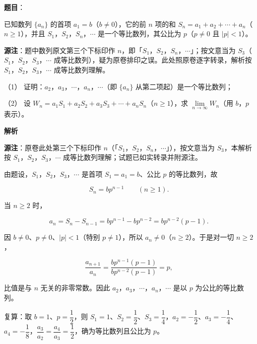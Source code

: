 \begin{answer}

\textbf{题目}：

已知数列 $\{a_n\}$ 的首项 $a_1=b$（$b\neq0$），它的前 $n$ 项的和 $S_n=a_1+a_2+\cdots+a_n$（$n\geqslant1$），并且 $S_1$，$S_2$，$S_n$，$\cdots$ 是一个等比数列，其公比为 $p$（$p\neq0$ 且 $\lvert p\rvert<1$）。

\begin{gktip}
\textbf{源注}：题中数列原文第三个下标印作 $n$，即「$S_1$，$S_2$，$S_n$，$\cdots$」；按文意当为 $S_3$（$S_1$，$S_2$，$S_3$，$\cdots$ 成等比数列），疑为原卷排印之误。此处照原卷逐字转录，解析按 $S_1$，$S_2$，$S_3$，$\cdots$ 成等比数列理解。
\end{gktip}

（1） 证明：$a_2$，$a_3$，$\cdots$，$a_n$，$\cdots$（即 $\{a_n\}$ 从第二项起）是一个等比数列；

（2） 设 $W_n=a_1S_1+a_2S_2+a_3S_3+\cdots+a_nS_n$（$n\geqslant1$），求 $\lim\limits_{n\to\infty}W_n$（用 $b$，$p$ 表示）。

\textbf{解析}

\begin{gktip}
\textbf{源注}：原卷此处第三个下标印作 $n$（「$S_1$，$S_2$，$S_n$，$\cdots$」），按文意当为 $S_3$，本解析按 $S_1$，$S_2$，$S_3$，$\cdots$ 成等比数列理解；试题已如实转录并附源注。
\end{gktip}


由题设，$S_1$，$S_2$，$S_3$，$\cdots$ 是首项 $S_1=a_1=b$、公比 $p$ 的等比数列，故

\nopagebreak[4]
\[
S_n=bp^{n-1}\qquad(n\geqslant1).
\]

当 $n\geqslant2$ 时，

\nopagebreak[4]
\[
a_n=S_n-S_{n-1}=bp^{n-1}-bp^{n-2}=bp^{n-2}(p-1).
\]

因 $b\neq0$、$p\neq0$、$\lvert p\rvert<1$（特别 $p\neq1$），所以 $a_n\neq0$（$n\geqslant2$）。于是对一切 $n\geqslant2$，

\nopagebreak[4]
\[
\frac{a_{n+1}}{a_n}=\frac{bp^{n-1}(p-1)}{bp^{n-2}(p-1)}=p,
\]

比值是与 $n$ 无关的非零常数。因此 $a_2$，$a_3$，$\cdots$，$a_n$，$\cdots$ 是以 $p$ 为公比的等比数列。

复算：取 $b=1$、$p=\dfrac12$，则 $S_1=1$、$S_2=\dfrac12$、$S_3=\dfrac14$，$a_2=-\dfrac12$、$a_3=-\dfrac14$、$a_4=-\dfrac18$，$\dfrac{a_3}{a_2}=\dfrac{a_4}{a_3}=\dfrac12$，确为等比数列且公比为 $p$。


\end{answer}
